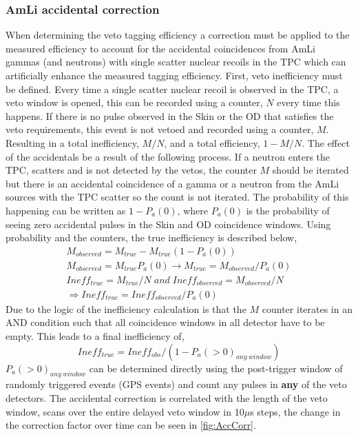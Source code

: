 \subsubsection{AmLi accidental correction}\label{sec:Veto/AmLiAccCorrection}
When determining the veto tagging efficiency a correction must be applied to the measured efficiency to account for the accidental coincidences from AmLi gammas (and neutrons) with single scatter nuclear recoils in the TPC which can artificially enhance the measured tagging efficiency.
First, veto inefficiency must be defined. Every time a single scatter nuclear recoil is observed in the TPC, a veto window is opened, this can be recorded using a counter, $N$ every time this happens.
If there is no pulse observed in the Skin or the OD that satisfies the veto requirements, this event is not vetoed and recorded using a counter, $M$. Resulting in a total inefficiency, $M/N$, and a total efficiency, $1-M/N$.
The effect of the accidentals be a result of the following process.
If a neutron enters the TPC, scatters and is not detected by the vetos, the counter $M$ should be iterated but there is an accidental coincidence of a gamma or a neutron from the AmLi sources with the TPC scatter so the count is not iterated.
The probability of this happening can be written as $1-P_a(0)$, where $P_a(0)$ is the probability of seeing zero accidental pulses in the Skin and OD coincidence windows.
Using probability and the counters, the true inefficiency is described below,
\begin{gather*}
	M_{observed}=M_{true}-M_{true}(1-P_a(0)) \\
	M_{observed}=M_{true}P_a(0)\rightarrow M_{true}=M_{observed}/P_a(0)\\
	Ineff_{true}=M_{true}/N\;and\;Ineff_{observed}=M_{observed}/N\\
	\Rightarrow Ineff_{true}=Ineff_{observed}/P_a(0)
\end{gather*}
Due to the logic of the inefficiency calculation is that the $M$ counter iterates in an AND condition such that all coincidence windows in all detector have to be empty.
This leads to a final inefficiency of,
\begin{equation}
	Ineff_{true} = Ineff_{obs}  / (1 - P_a(>0)_{any\:window})
\end{equation}
$P_a(>0)_{any\:window}$ can be determined directly using the post-trigger window of randomly triggered events (GPS events) and count any pulses in \textbf{any} of the veto detectors.
The accidental correction is correlated with the length of the veto window, scans over the entire delayed veto window in 10$\mu$s steps, the change in the correction factor over time can be seen in \autoref{fig:AccCorr}.
